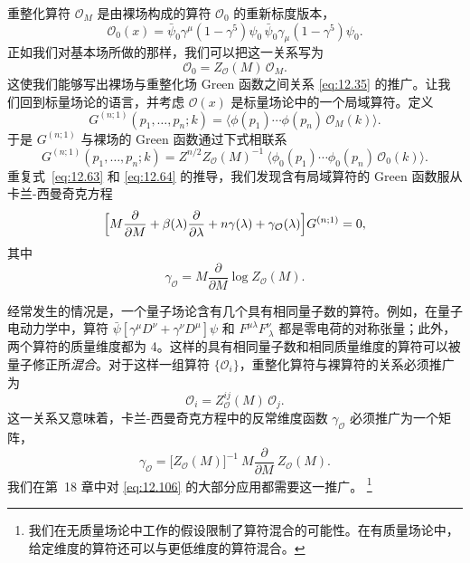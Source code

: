 重整化算符 $\mathcal{O}_M$ 是由裸场构成的算符 $\mathcal{O}_0$ 的重新标度版本，
\begin{equation}
  \mathcal{O}_0(x) = \bar{\psi}_0\gamma^\mu(1-\gamma^5)\psi_0\,
    \bar{\psi}_0\gamma_\mu(1-\gamma^5)\psi_0 .
  \label{eq:12.102}
\end{equation}
正如我们对基本场所做的那样，我们可以把这一关系写为
\begin{equation}
  \mathcal{O}_0 = Z_{\mathcal{O}}(M)\,\mathcal{O}_M .
  \label{eq:12.103}
\end{equation}
这使我们能够写出裸场与重整化场 Green 函数之间关系 \eqref{eq:12.35} 的推广。让我们回到标量场论的语言，并考虑 $\mathcal{O}(x)$ 是标量场论中的一个局域算符。定义
\begin{equation}
  G^{(n;1)}(p_1, \ldots, p_n; k) = \bigl\langle \phi(p_1)\cdots\phi(p_n)\,
    \mathcal{O}_M(k) \bigr\rangle .
  \label{eq:12.104}
\end{equation}
于是 $G^{(n;1)}$ 与裸场的 Green 函数通过下式相联系
\begin{equation}
  G^{(n;1)}(p_1, \ldots, p_n; k) = Z^{n/2}Z_{\mathcal{O}}(M)^{-1}\
    \bigl\langle \phi_0(p_1)\cdots\phi_0(p_n)\,\mathcal{O}_0(k) \bigr\rangle .
  \label{eq:12.105}
\end{equation}
重复式~\eqref{eq:12.63} 和 \eqref{eq:12.64} 的推导，我们发现含有局域算符的 Green 函数服从卡兰-西曼奇克方程
\begin{equation}
  \Bigl[ M\frac{\partial}{\partial M} + \beta(\lambda)\frac{\partial}
    {\partial\lambda} + n\gamma(\lambda) + \gamma_{\mathcal{O}}(\lambda) \Bigr]
    G^{(n;1)} = 0 ,
  \label{eq:12.106}
\end{equation}
其中
\begin{equation}
  \gamma_{\mathcal{O}} = M\frac{\partial}{\partial M}\log Z_{\mathcal{O}}(M)
  .
  \label{eq:12.107}
\end{equation}

经常发生的情况是，一个量子场论含有几个具有相同量子数的算符。例如，在量子电动力学中，算符 $\bar{\psi}[\gamma^\mu D^\nu + \gamma^\nu D^\mu]\psi$ 和 $F^{\mu\lambda}F^{\nu}_{\ \lambda}$ 都是零电荷的对称张量；此外，两个算符的质量维度都为 4。这样的具有相同量子数和相同质量维度的算符可以被量子修正所\emph{混合}。对于这样一组算符 $\{\mathcal{O}_i\}$，重整化算符与裸算符的关系必须推广为
\begin{equation}
  \mathcal{O}_i = Z^{ij}_{\mathcal{O}}(M)\,\mathcal{O}_j .
  \label{eq:12.108}
\end{equation}
这一关系又意味着，卡兰-西曼奇克方程中的反常维度函数 $\gamma_{\mathcal{O}}$ 必须推广为一个矩阵，
\begin{equation}
  \gamma_{\mathcal{O}} = \bigl[ Z_{\mathcal{O}}(M) \bigr]^{-1}\ M\frac{\partial}
    {\partial M}\ Z_{\mathcal{O}}(M) .
  \label{eq:12.109}
\end{equation}
我们在第~18 章中对 \eqref{eq:12.106} 的大部分应用都需要这一推广。%
\footnote{我们在无质量场论中工作的假设限制了算符混合的可能性。在有质量场论中，给定维度的算符还可以与更低维度的算符混合。}

